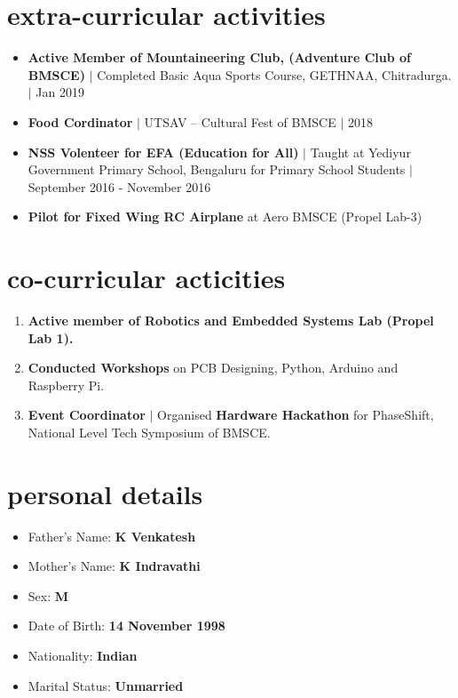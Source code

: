 \documentclass[margin,line]{res}
\begin{document}
\begin{resume}
		\section{\sc extra-curricular activities}

			\begin{itemize}
				\item \textbf{Active Member of Mountaineering Club, (Adventure Club of BMSCE)} $\vert$ Completed Basic Aqua Sports Course, GETHNAA, Chitradurga. $\vert$ Jan 2019
				\item \textbf{Food Cordinator} $\vert$ UTSAV -- Cultural Fest of BMSCE $\vert$ 2018
				\item \textbf{NSS Volenteer for EFA (Education for All)} $\vert$ Taught at Yediyur Government Primary School, Bengaluru for Primary School Students $\vert$ September 2016 - November 2016
					\item \textbf{Pilot for Fixed Wing RC Airplane} at Aero BMSCE (Propel Lab-3)
			\end{itemize} 

		\section{\sc co-curricular acticities}

			\begin{enumerate}
				\item \textbf{Active member of Robotics and Embedded Systems Lab (Propel Lab 1).}
				\item \textbf{Conducted Workshops} on PCB Designing, Python, Arduino and Raspberry Pi.
				\item \textbf{Event Coordinator} $\vert$ Organised \textbf{Hardware Hackathon} for PhaseShift, National Level Tech Symposium of BMSCE.
			\end{enumerate}

		\section{\sc personal details}

			\begin{itemize}
				\item Father's Name: \textbf{K Venkatesh}
				\item Mother's Name: \textbf{K Indravathi}
				\item Sex: \textbf{M}
				\item Date of Birth: \textbf{14 November 1998}
				\item Nationality: \textbf{Indian}
				\item Marital Status: \textbf{Unmarried}
			\end{itemize}


\end{resume}
\end{document}
